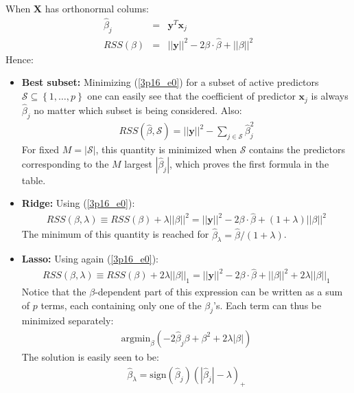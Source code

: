 


When $\mathbf{X}$ has orthonormal colums:
\begin{eqnarray}
\hat{\beta}_j & = & \mathbf{y}^T \mathbf{x}_j \\
\label{3p16_e0}
RSS(\beta) & = & ||\mathbf{y}||^2 - 2 \beta \cdot \hat{\beta} + ||\beta||^2
\end{eqnarray}
Hence:
\begin{itemize}
    \item \textbf{Best subset:} Minimizing (\ref{3p16_e0}) for a subset of active
    predictors $\mathcal{S} \subseteq \left\{ 1, \ldots, p \right\}$ one can easily
    see that the coefficient of predictor $\mathbf{x}_j$ is always $\hat{\beta}_j$
    no matter which subset is being considered. Also:
    \begin{eqnarray*}
        RSS(\hat{\beta}, \mathcal{S}) = ||\mathbf{y}||^2 - \sum_{j \in \mathcal{S}} \hat{\beta}_j^2
    \end{eqnarray*}
    For fixed $M = |\mathcal{S}|$, this quantity is minimized when $\mathcal{S}$ contains
    the predictors corresponding to the $M$ largest $|\hat{\beta}_j|$, which proves
    the first formula in the table.
    \item \textbf{Ridge:} Using (\ref{3p16_e0}):
    \begin{eqnarray*}
        RSS(\beta, \lambda) \equiv RSS(\beta) + \lambda ||\beta||^2 = ||\mathbf{y}||^2 - 2 \beta \cdot \hat{\beta} + \left( 1 + \lambda \right)||\beta||^2
    \end{eqnarray*}
    The minimum of this quantity is reached for $\hat{\beta}_{\lambda} = \hat{\beta} / (1 + \lambda)$.
    \item \textbf{Lasso: } Using again (\ref{3p16_e0}):
    \begin{eqnarray*}
        RSS(\beta, \lambda) \equiv RSS(\beta) + 2 \lambda ||\beta||_1 = ||\mathbf{y}||^2 - 2 \beta \cdot \hat{\beta} + ||\beta||^2 + 2 \lambda ||\beta||_1
    \end{eqnarray*}
    Notice that the $\beta$-dependent part of this expression can be written as a sum
    of $p$ terms, each containing only one of the $\beta_j$'s. Each term can thus be
    minimized separately:
    \begin{eqnarray*}
        \textrm{argmin}_\beta \left( - 2 \hat{\beta}_j \beta + \beta^2 + 2 \lambda |\beta|   \right)
    \end{eqnarray*}
    The solution is easily seen to be:
    \begin{eqnarray*}
        \hat{\beta}_\lambda = \textrm{sign}(\hat{\beta}_j) \left( |\hat{\beta}_j| - \lambda \right)_+
    \end{eqnarray*}
\end{itemize}